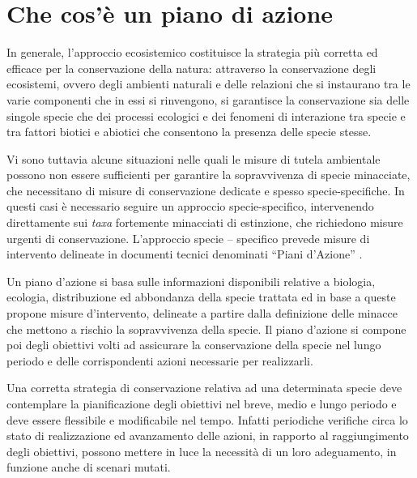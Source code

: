 \documentclass[10pt,twoside,openany,x11names,svgnames,italian,a5paper,dvipsnames,table]{memoir}
\newcommand\chapterillustration{}
\begin{document}
\setlength\afterchapskip{10mm}
\chapter{Che cos'\`e un piano di azione}
\renewcommand\chapterillustration{}
\footnotesize
\vspace{.5cm}
In generale, l'approccio ecosistemico costituisce la strategia più corretta ed efficace per la conservazione della natura: attraverso la conservazione degli ecosistemi, ovvero degli ambienti naturali e delle relazioni che si instaurano tra le varie componenti che in essi si rinvengono, si garantisce la conservazione sia delle singole specie che dei processi ecologici e dei fenomeni di interazione tra specie e tra fattori biotici e abiotici che consentono la presenza delle specie stesse.

Vi sono tuttavia alcune situazioni nelle quali le misure di tutela ambientale possono non essere sufficienti per garantire la sopravvivenza di specie minacciate, che necessitano di misure di conservazione dedicate e spesso specie-specifiche. In questi casi è necessario seguire un approccio specie-specifico, intervenendo direttamente sui \emph{taxa} fortemente minacciati di estinzione, che richiedono misure urgenti di conservazione. L’approccio specie – specifico prevede misure di intervento delineate in documenti tecnici denominati “Piani d’Azione” \cite{EUCOUNCIL98}.

Un piano d’azione si basa sulle informazioni disponibili relative a biologia, ecologia, distribuzione ed abbondanza della specie trattata ed in base a queste propone misure d’intervento, delineate a partire dalla definizione delle minacce che mettono a rischio la sopravvivenza della specie. Il piano d’azione si compone poi degli obiettivi volti ad assicurare la conservazione della specie nel lungo periodo e delle corrispondenti azioni necessarie per realizzarli.

Una corretta strategia di conservazione relativa ad una determinata specie deve contemplare la pianificazione degli obiettivi nel breve, medio e lungo periodo e deve essere flessibile e modificabile nel tempo. Infatti periodiche verifiche circa lo stato di realizzazione ed avanzamento delle azioni, in rapporto al raggiungimento degli obiettivi, possono mettere in luce la necessità di un loro adeguamento, in funzione anche di scenari mutati.
\end{document}
